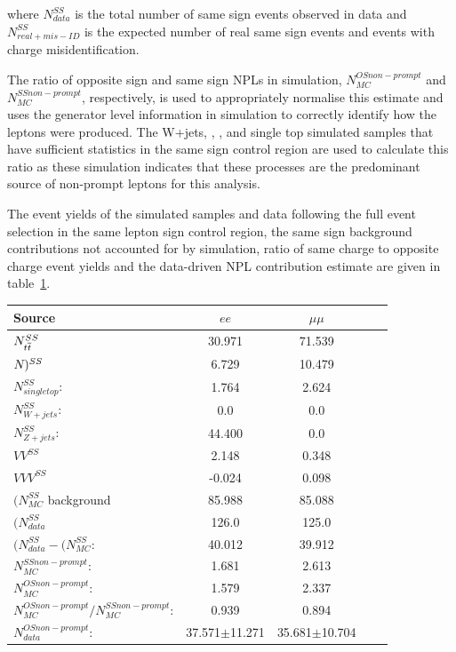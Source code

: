 where $N_{data}^{SS}$ is the total number of same sign events observed in data and $N^{SS}_{real + mis-ID}$ is the expected number of real same sign events and events with charge misidentification.

The ratio of opposite sign and same sign NPLs in simulation, $N_{MC}^{OS non-prompt}$ and $N_{MC}^{SS non-prompt}$, respectively, is used to appropriately normalise this estimate and uses the generator level information in simulation to correctly identify how the leptons were produced.
The W+jets, \ttZ, \ttW, and single top simulated samples that have sufficient statistics in the same sign control region are used to calculate this ratio as these simulation indicates that these processes are the predominant source of non-prompt leptons for this analysis.

The event yields of the simulated samples and data following the full event selection in the same lepton sign control region, the same sign background contributions not accounted for by simulation, ratio of same charge to opposite charge event yields and the data-driven NPL contribution estimate are given in table~\ref{tab:fakeLeptonYields}.


\begin{table}[htbp]
\centering
\begin{tabular}{l | cccc}
\hline
Source &  $ee$ & $\mu\mu$  \\ 
\hline
$N_{t\overline{t}}^{SS}$ & 30.971 & 71.539   \\
$N_{\tt})^{SS}$ & 6.729 & 10.479   \\ 
$N_{single top}^{SS}$: & 1.764 & 2.624   \\
$N_{W+jets}^{SS}$: & 0.0 & 0.0   \\
$N_{Z+jets}^{SS}$: & 44.400 & 0.0   \\
$VV^{SS}$ & 2.148 & 0.348  \\
$VVV^{SS}$ & -0.024 & 0.098 \\
\hline
$(N_{MC}^{SS}$ background & 85.988 & 85.088  \\ 
$(N_{data}^{SS}$ & 126.0 & 125.0  \\ 
\hline
$(N_{data}^{SS} - (N_{MC}^{SS}$: & 40.012 & 39.912 \\
\hline
$N_{MC}^{SS non-prompt}$: & 1.681 & 2.613 \\
$N_{MC}^{OS non-prompt}$: & 1.579 & 2.337 \\
$N_{MC}^{OS non-prompt}/N_{MC}^{SS non-prompt}$: & 0.939 & 0.894 \\
\hline
$N_{data}^{OS non-prompt}$: & 37.571$\pm$11.271 & 35.681$\pm$10.704 \\
\hline
\end{tabular}
\label{tab:fakeLeptonYields}
\end{table}

